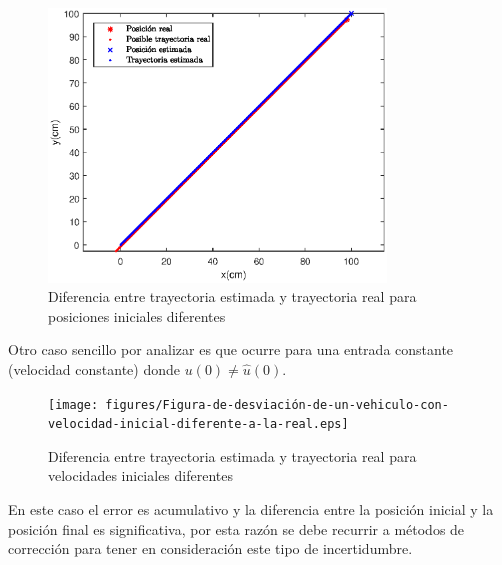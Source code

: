 \begin{figure}[htb]
\centering
\includegraphics[width=0.8\textwidth]{figures/Figura-de-desviación-de-un-vehiculo-con-posición-incial-deferente-a-la-real.eps}
\caption{Diferencia entre trayectoria estimada y trayectoria real para posiciones iniciales diferentes} \label{fig:Pini_dif}
\end{figure}

Otro caso sencillo por analizar es que ocurre para una entrada constante (velocidad constante) donde $u(0)\neq\hat{u}(0)$.

\begin{figure}[htb]
\centering
\texttt{[image: figures/Figura-de-desviación-de-un-vehiculo-con-velocidad-inicial-diferente-a-la-real.eps]}
\caption{Diferencia entre trayectoria estimada y trayectoria real para velocidades iniciales diferentes} \label{fig:Vini_dif}
\end{figure}
\par 

En este caso el error es acumulativo y la diferencia entre la posición inicial y la posición final es significativa, por esta razón se debe recurrir a métodos de corrección para tener en consideración este tipo de incertidumbre. 

